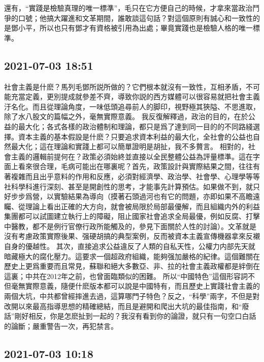 \documentclass[twocolumn]{ctexart}
\begin{document}
還有，“實踐是檢驗真理的唯一標準”，毛只在它方便自己的時候，才拿來當政治鬥爭的口號；他搞大躍進和文革期間，誰敢談這句話？對這個原則有誠心和一致性的是鄧小平，所以也只有鄧才有資格被引用為出處；畢竟實踐也是檢驗人格的唯一標準。
\subsection*{2021-07-03 18:51}

社會主義是什麽？馬列毛鄧所説所做的？它們根本就沒有一致性，互相矛盾，不可能充當定義，更別提成就參差不齊，導致你説的西方媒體可以很容易就把社會主義汙名化。而且從理論角度，一味低頭追尋前人的脚印，視野極其狹隘、不思進取，除了水八股文的篇幅之外，毫無實際意義。
我反復解釋過，政治的目的，在於公益的最大化；各式各樣的政治體制和理論，都只是爲了達到同一目的的不同路綫選擇。資本主義的基本假設是什麽？只要追求資本利益的最大化，全社會的公益也自然最大化；這在理論和實踐上都可以簡單證明是胡扯，我不多贅言。
相對的，社會主義的邏輯前提何在？政策必須始終並直接以全民整體公益為評量標準。這在字面上看來很合理，毛病可能出在哪裏呢？首先，政策設計與實際結果之間，往往有著複雜而且出乎意料的作用和反應，必須對經濟學、政治學、社會學、心理學等等社科學科進行深刻、甚至是開創性的思考，才能事先計算預估。如果做不到，就只好步步爲營，以實驗結果為導向（摸著石頭過河也有它的問題，亦即如果不高瞻遠矚、從理論上看出正確的大方向，就會被局限於局部最優解，而且組織内外的利益集團都可以試圖建立執行上的障礙，阻止國家社會追求全局最優，例如反腐、打擊中醫教，都不是例行官僚行政所能觸及的，參見下面關於人性的討論）。文革就是沒有考慮政策實際後果、强硬胡搞的典型案例，反而被資本主義宣傳機器拿來反襯自身的優越性。
其次，直接追求公益違反了人類的自私天性，公權力内部先天就暗藏極大的腐化壓力。這要求一個超政府組織，能夠强加嚴格的紀律。這個難關在歷史上更爲重要而且常見，蘇聯和絕大多數亞、非、拉的社會主義政權都是絆倒在這裏；中共在2012年之前，也曾面臨類似的困難。
所以“中國特色”這個形容詞不但毫無實際意義，隨便什麽版本都可以說是中國特有，而且歷史上實踐社會主義的兩個大坑，中共都曾經摔進去過，這算哪門子特色？反之，“科學”兩字，不但是對改開以來最高指導思想的精確總結，而且是避開和爬出大坑的最佳指南，和“廢話”剛好相反，你是怎麽扯到一起的？我沒有看到你的論證，就只有一句空口白話的論斷；嚴重警告一次，再犯禁言。
\subsection*{2021-07-03 10:18}
\end{document}
